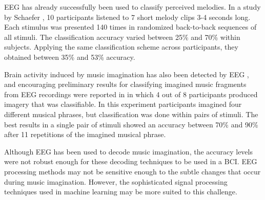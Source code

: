 EEG has already successfully been used to classify perceived melodies. 
In a study by Schaefer \etal \citeyear{schaefer_name_2011}, 10 participants listened to 7 short melody clips 3-4 seconds long.
Each stimulus was presented 140 times in randomized back-to-back sequences of all stimuli.
The classification accuracy varied between 25\% and 70\% within subjects.
Applying the same classification scheme across participants, they obtained between 35\% and 53\% accuracy.

Brain activity induced by music imagination has also been detected by \ac{EEG} \cite{schaefer_shared_2013}, and encouraging preliminary results for classifying imagined music fragments from \ac{EEG} recordings were reported in \cite{schaefer_single_2009} in which 4 out of 8 participants produced imagery that was classifiable. 
In this experiment participants imagined four different musical phrases, but classification was done within pairs of stimuli.
The best results in a single pair of stimuli showed an accuracy between 70\% and 90\% after 11 repetitions of the imagined musical phrase. 

Although \ac{EEG} has been used to decode music imagination, the accuracy levels were not robust enough for these decoding techniques to be used in a \ac{BCI}. 
EEG processing methods may not be sensitive enough to the subtle changes that occur during music imagination. 
However, the sophisticated signal processing techniques used in machine learning may be more suited to this challenge. 

